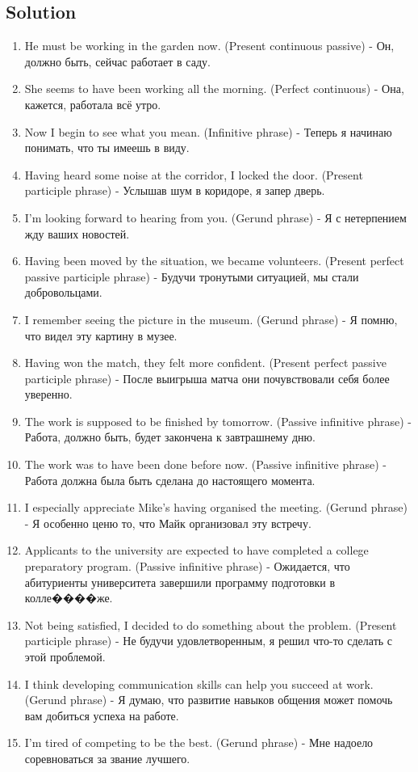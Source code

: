 \subsection*{Solution}
\begin{enumerate}
      \item He must be working in the garden now. (Present continuous passive) - Он, должно быть, сейчас работает в саду.
      \item She seems to have been working all the morning. (Perfect continuous) - Она, кажется, работала всё утро.
      \item Now I begin to see what you mean. (Infinitive phrase) - Теперь я начинаю понимать, что ты имеешь в виду.
      \item Having heard some noise at the corridor, I locked the door. (Present participle phrase) - Услышав шум в коридоре, я запер дверь.
      \item I’m looking forward to hearing from you. (Gerund phrase) - Я с нетерпением жду ваших новостей.
      \item Having been moved by the situation, we became volunteers. (Present perfect passive participle phrase) - Будучи тронутыми ситуацией, мы стали добровольцами.
      \item I remember seeing the picture in the museum. (Gerund phrase) - Я помню, что видел эту картину в музее.
      \item Having won the match, they felt more confident. (Present perfect passive participle phrase) - После выигрыша матча они почувствовали себя более уверенно.
      \item The work is supposed to be finished by tomorrow. (Passive infinitive phrase) - Работа, должно быть, будет закончена к завтрашнему дню.
      \item The work was to have been done before now. (Passive infinitive phrase) - Работа должна была быть сделана до настоящего момента.
      \item I especially appreciate Mike's having organised the meeting. (Gerund phrase) - Я особенно ценю то, что Майк организовал эту встречу.
      \item Applicants to the university are expected to have completed a college preparatory program. (Passive infinitive phrase) - Ожидается, что абитуриенты университета завершили программу подготовки в колле����же.
      \item Not being satisfied, I decided to do something about the problem. (Present participle phrase) - Не будучи удовлетворенным, я решил что-то сделать с этой проблемой.
      \item I think developing communication skills can help you succeed at work. (Gerund phrase) - Я думаю, что развитие навыков общения может помочь вам добиться успеха на работе.
      \item I’m tired of competing to be the best. (Gerund phrase) - Мне надоело соревноваться за звание лучшего.
\end{enumerate}

